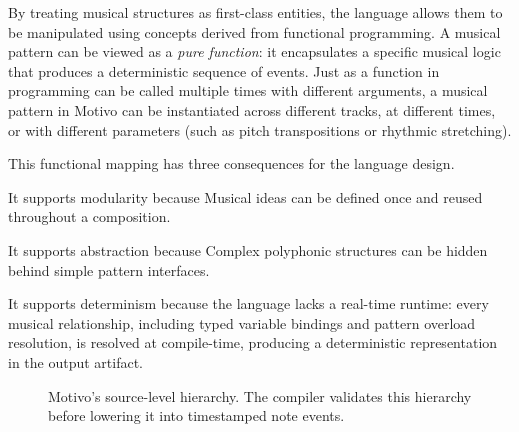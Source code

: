 By treating musical structures as first-class entities, the language allows them to be manipulated using concepts
derived from functional programming.
A musical pattern can be viewed as a \textit{pure function}: it encapsulates a specific musical logic that produces a
deterministic sequence of events.
Just as a function in programming can be called multiple times with different arguments, a musical pattern in
Motivo can be instantiated across different tracks, at different times, or with different parameters (such as
pitch transpositions or rhythmic stretching).

This functional mapping has three consequences for the language design.

It supports modularity because Musical ideas can be defined once and reused throughout a composition.

It supports abstraction because Complex polyphonic structures can be hidden behind simple pattern interfaces.

It supports determinism because the language lacks a real-time runtime: every musical relationship, including typed
variable bindings and pattern overload resolution, is resolved at compile-time, producing a deterministic
representation in the output artifact.

\begin{figure}[htbp]
  \centering
  \caption{Motivo's source-level hierarchy.
  The compiler validates this hierarchy before lowering it into timestamped note events.}\label{fig:motivo-hierarchy}
\end{figure}
